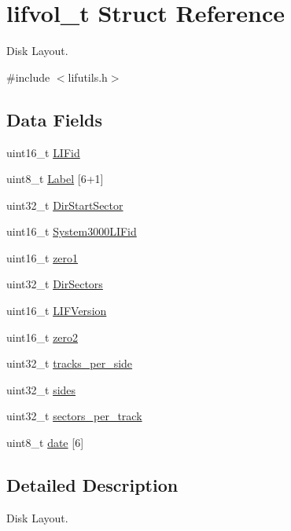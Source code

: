 \hypertarget{structlifvol__t}{}\section{lifvol\+\_\+t Struct Reference}
\label{structlifvol__t}


Disk Layout.  




{\ttfamily \#include $<$lifutils.\+h$>$}

\subsection*{Data Fields}
\begin{DoxyCompactItemize}
\item 
uint16\+\_\+t \hyperlink{structlifvol__t_adb6a0c2fff5b765eb12c3eb5db6d5bad}{L\+I\+Fid}
\item 
uint8\+\_\+t \hyperlink{structlifvol__t_abbccb2f637812a31d24aa1f6725194be}{Label} \mbox{[}6+1\mbox{]}
\item 
uint32\+\_\+t \hyperlink{structlifvol__t_a89b86c990a7843cfa2addfff9a775137}{Dir\+Start\+Sector}
\item 
uint16\+\_\+t \hyperlink{structlifvol__t_a98097f8c951448cbab6019b7b703e4d0}{System3000\+L\+I\+Fid}
\item 
uint16\+\_\+t \hyperlink{structlifvol__t_a5e749ae4bff79deaa813966cff04f431}{zero1}
\item 
uint32\+\_\+t \hyperlink{structlifvol__t_aceac3bc67cda1f79d91c002411e33897}{Dir\+Sectors}
\item 
uint16\+\_\+t \hyperlink{structlifvol__t_afffd824a7b0ce6aa8410fa243733475f}{L\+I\+F\+Version}
\item 
uint16\+\_\+t \hyperlink{structlifvol__t_ac05fef8e2c908110de7083d7afbfdb37}{zero2}
\item 
uint32\+\_\+t \hyperlink{structlifvol__t_aae9e5135f98b80312eb785ac3747fc31}{tracks\+\_\+per\+\_\+side}
\item 
uint32\+\_\+t \hyperlink{structlifvol__t_a5b8ecfb441b010f69cb90b923cc50719}{sides}
\item 
uint32\+\_\+t \hyperlink{structlifvol__t_ad245f7419e180934262f53acd9b4349c}{sectors\+\_\+per\+\_\+track}
\item 
uint8\+\_\+t \hyperlink{structlifvol__t_a41f630e7211326270dc6e72a55f94516}{date} \mbox{[}6\mbox{]}
\end{DoxyCompactItemize}


\subsection{Detailed Description}
Disk Layout. 

